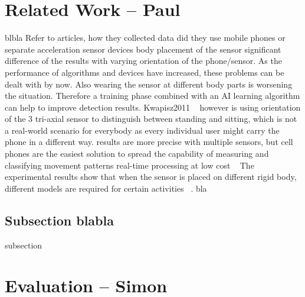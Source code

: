 \documentclass[conference]{IEEEtran}
\begin{document}
\section{Related Work -- Paul}
blbla
Refer to articles, how they collected data
did they use mobile phones or separate acceleration sensor devices
body placement of the sensor
significant difference of the results with varying orientation of the phone/sensor. As the performance of algorithms and devices have increased, these problems can be dealt with by now. Also wearing the sensor at different body parts is worsening the situation. Therefore a training phase combined with an AI learning algorithm can help to improve detection results.
Kwapisz2011 ~\cite{Kwapisz2011} however is using orientation of the 3 tri-axial sensor to distinguish between standing and sitting, which is not a real-world scenario for everybody as every individual user might carry the phone in a different way.
results are more precise with multiple sensors, but cell phones are the easiest solution to spread the capability of measuring and classifying movement patterns
real-time processing at low cost ~\cite{Brezmes2009}
The experimental results show that when the sensor is placed on different rigid body, different models are required for certain activities ~\cite{Henpraserttae2011}.
bla
\subsection{Subsection blabla}
subsection

\section{Evaluation -- Simon}
\end{document}
